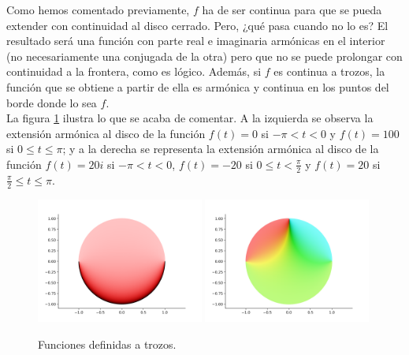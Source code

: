 Como hemos comentado previamente, $f$ ha de ser continua para que se pueda extender con continuidad al disco cerrado. Pero, ¿qué pasa cuando no lo es? El resultado será una función con parte real e imaginaria armónicas en el interior (no necesariamente una conjugada de la otra) pero que no se puede prolongar con continuidad a la frontera, como es lógico. Además, si $f$ es continua a trozos, la función que se obtiene a partir de ella es armónica y continua en los puntos del borde donde lo sea $f$. \\

La figura \ref{fig:atrozos} ilustra lo que se acaba de comentar. A la izquierda se observa la extensión armónica al disco de la función $f(t) = 0$ si $- \pi < t < 0$ y $f(t) = 100$ si $0 \leq t \leq \pi$; y a la derecha se representa la extensión armónica al disco de la función $f(t) = 20i$ si $- \pi < t < 0$, $f(t) = -20$ si $0 \leq t < \frac{\pi}{2}$ y $f(t) = 20$ si $\frac{\pi}{2} \leq t \leq \pi$. \\

\begin{figure}[!htbp]
    \centering
    \includegraphics[width=0.49\textwidth]{../Aplicacion/atrozos.png}
    \hfil
    \includegraphics[width=0.49\textwidth]{../Aplicacion/atrozos(2).png}
    \caption{Funciones definidas a trozos.}
    \label{fig:atrozos}
\end{figure}

